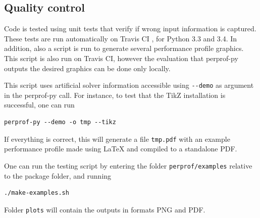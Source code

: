 \subsection*{Quality control}

    Code is tested using unit tests that verify if wrong input information
    is captured. These tests are run automatically on Travis CI
    \cite{url:travis}, for Python 3.3 and 3.4.
    In addition, also a script is run to generate several performance profile
    graphics. This script is also run on Travis CI, however the evaluation 
    that perprof-py outputs the desired  graphics can be done only locally.

    This script uses artificial solver information accessible using \verb+--demo+
    as argument in the perprof-py call.
    For instance, to test that the TikZ installation is successful, one can run
\begin{verbatim}
perprof-py --demo -o tmp --tikz
\end{verbatim}
    If everything is correct, this will generate a file \verb+tmp.pdf+ with an
    example performance profile made using LaTeX and compiled to a standalone
    PDF.

    One can run the testing script
    by entering the folder
    \verb+perprof/examples+ relative to the package folder, and running
\begin{verbatim}
./make-examples.sh
\end{verbatim}
    Folder \verb+plots+ will contain the outputs in formats PNG and PDF.
